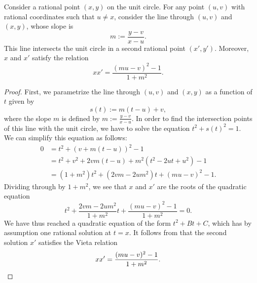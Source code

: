\begin{theorem}\label{theorem:vieta-jumping-rational-points-unit-circle}
  Consider a rational point $(x,y)$ on the unit circle. For any point $(u,v)$ with rational coordinates such that $u\neq x$, consider the line through $(u,v)$ and $(x,y)$, whose slope is
  \begin{equation*}
    m:=\frac{y-v}{x-u}.
  \end{equation*}
  This line intersects the unit circle in a second rational point $(x',y')$. Moreover, $x$ and $x'$ satisfy the relation
  \begin{equation*}
    xx' = \frac{(mu-v)^2 -1}{1+m^2}.
  \end{equation*}
\end{theorem}

\begin{proof}
  First, we parametrize the line through $(u,v)$ and $(x,y)$ as a function of $t$ given by
  \begin{equation*}
    s(t) := m(t-u)+v,
  \end{equation*}
  where the slope $m$ is defined by $m:=\tfrac{y-v}{x-u}$. In order to find the intersection points of this line with the unit circle, we have to solve the equation $t^2+s(t)^2=1$. We can simplify this equation as follows:
  \begin{align*}
    0 & = t^2 + (v+m(t-u))^2 - 1 \\
      & = t^2 + v^2 + 2vm(t-u) +m^2(t^2-2ut + u^2) -1 \\
      & = (1+m^2)t^2 + (2vm - 2um^2)t + (mu-v)^2 -1.
  \end{align*}
  Dividing through by $1+m^2$, we see that $x$ and $x'$ are the roots of the quadratic equation
  \begin{equation*}
    t^2 + \frac{2vm - 2um^2}{1+m^2}t + \frac{(mu-v)^2 -1}{1+m^2}=0.
  \end{equation*}
  We have thus reached a quadratic equation of the form $t^2+Bt+C$, which has by assumption one rational solution at $t=x$. It follows from  that the second solution $x'$ satisfies the Vieta relation
  \begin{equation*}
    xx' = \frac{(mu-v)^2 -1}{1+m^2}.\qedhere
  \end{equation*}
\end{proof}

